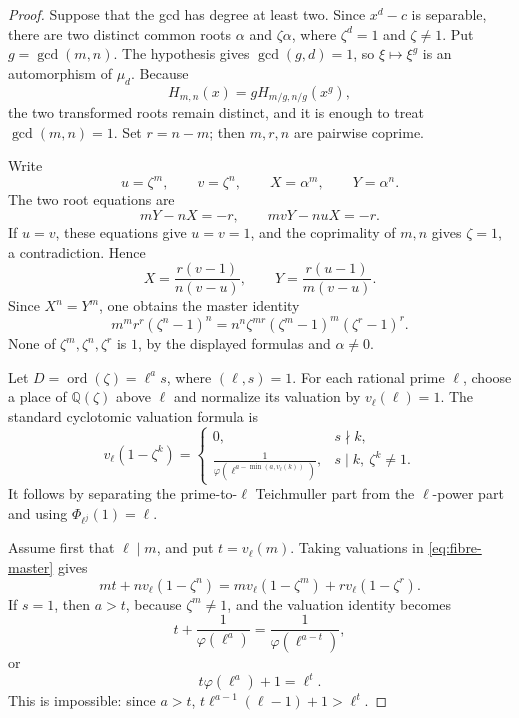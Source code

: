 \documentclass[11pt]{article}
\numberwithin{equation}{section}
\theoremstyle{definition}
\newcommand{\Q}{\mathbb Q}
\newcommand{\ord}{\operatorname{ord}}
\begin{document}
\begin{proof}
Suppose that the gcd has degree at least two.  Since \(x^d-c\) is
separable, there are two distinct common roots \(\alpha\) and
\(\zeta\alpha\), where \(\zeta^d=1\) and \(\zeta\neq1\).  Put
\(g=\gcd(m,n)\).  The hypothesis gives \(\gcd(g,d)=1\), so
\(\xi\mapsto\xi^g\) is an automorphism of \(\mu_d\).  Because
\[
 H_{m,n}(x)=gH_{m/g,n/g}(x^g),
\]
the two transformed roots remain distinct, and it is enough to treat
\(\gcd(m,n)=1\).  Set \(r=n-m\); then \(m,r,n\) are pairwise coprime.

Write
\[
 u=\zeta^m,\qquad v=\zeta^n,\qquad
 X=\alpha^m,\qquad Y=\alpha^n.
\]
The two root equations are
\[
 mY-nX=-r,\qquad mvY-nuX=-r.
\]
If \(u=v\), these equations give \(u=v=1\), and the coprimality of
\(m,n\) gives \(\zeta=1\), a contradiction.  Hence
\[
 X=\frac{r(v-1)}{n(v-u)},\qquad
 Y=\frac{r(u-1)}{m(v-u)}.
\]
Since \(X^n=Y^m\), one obtains the master identity
\begin{equation}
 m^m r^r(\zeta^n-1)^n
 =n^n\zeta^{mr}(\zeta^m-1)^m(\zeta^r-1)^r.
 \label{eq:fibre-master}
\end{equation}
None of \(\zeta^m,\zeta^n,\zeta^r\) is \(1\), by the displayed formulas
and \(\alpha\neq0\).

Let \(D=\ord(\zeta)=\ell^a s\), where \((\ell,s)=1\).  For each
rational prime \(\ell\), choose a place of \(\Q(\zeta)\) above \(\ell\)
and normalize its valuation by \(v_\ell(\ell)=1\).  The standard
cyclotomic valuation formula is
\[
 v_\ell(1-\zeta^k)=
 \begin{cases}
 0,&s\nmid k,\\[2mm]
 \displaystyle
 \frac1{\varphi(\ell^{a-\min(a,v_\ell(k))})},
 &s\mid k,\ \zeta^k\neq1.
 \end{cases}
\]
It follows by separating the prime-to-\(\ell\) Teichmuller part from the
\(\ell\)-power part and using \(\Phi_{\ell^j}(1)=\ell\).

Assume first that \(\ell\mid m\), and put \(t=v_\ell(m)\).  Taking
valuations in \eqref{eq:fibre-master} gives
\begin{equation}
 mt+n v_\ell(1-\zeta^n)
 =m v_\ell(1-\zeta^m)+r v_\ell(1-\zeta^r).
 \label{eq:fibre-valuation}
\end{equation}
If \(s=1\), then \(a>t\), because \(\zeta^m\neq1\), and the valuation
identity becomes
\[
 t+\frac1{\varphi(\ell^a)}
 =\frac1{\varphi(\ell^{a-t})},
\]
or
\[
 t\varphi(\ell^a)+1=\ell^t.
\]
This is impossible: since \(a>t\),
\(t\ell^{a-1}(\ell-1)+1>\ell^t\).


\end{proof}
\end{document}
